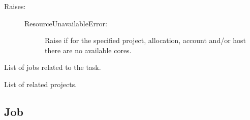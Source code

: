 \documentclass[letterpaper,10pt,english]{sphinxmanual}
\begin{document}
\begin{fulllineitems}
\begin{fulllineitems}
\begin{description}
\item[{Raises:}] \leavevmode\begin{description}
\item[{ResourceUnavailableError:}] \leavevmode
Raise if for the specified project, allocation, account and/or host
there are no available cores.

\end{description}

\end{description}

\end{fulllineitems}


\begin{fulllineitems}
\label{models:qmpy.Task.jobs}
List of jobs related to the task.

\end{fulllineitems}


\begin{fulllineitems}
\label{models:qmpy.Task.projects}
List of related projects.

\end{fulllineitems}


\end{fulllineitems}



\subsection{Job}
\label{models:job}
\end{document}

